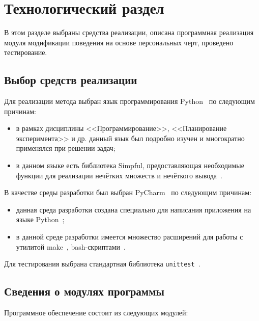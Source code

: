 \chapter{Технологический раздел}

В этом разделе выбраны средства реализации, описана программная реализация модуля модификации поведения на основе персональных черт, проведено тестирование.

\section{Выбор средств реализации}

Для реализации метода выбран язык программирования Python~\cite{info_pl} по следующим причинам:

\begin{itemize}
	\item в рамках дисциплины <<Программирование>>, <<Планирование эксперимента>> и др. данный язык был подробно изучен и многократно применялся при решении задач;
	\item в данном языке есть библиотека Simpful, предоставляющая необходимые функции для реализации нечётких множеств и нечёткого вывода~\cite{spolaor2020simpful}.
\end{itemize}

В качестве среды разработки был выбран PyCharm~\cite{pycharm_ide} по следующим причинам:

\begin{itemize}
	\item данная среда разработки создана специально для написания приложения на языке Python~\cite{pycharm_ide};
	\item в данной среде разработки имеется множество расширений для работы с утилитой make~\cite{stallman2006gnuMake}, bash-скриптами~\cite{bash_scripts_docs}.
\end{itemize}

Для тестирования выбрана стандартная библиотека \texttt{unittest}~\cite{python_unittest_docs}.

\section{Сведения о модулях программы}

Программное обеспечение состоит из следующих модулей:


